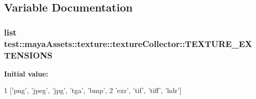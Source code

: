 \subsection{\-Variable \-Documentation}
\hypertarget{namespacetest_1_1mayaAssets_1_1texture_1_1textureCollector_a0fd5dad17efa7fba535d8811b6c4c6b9}{
\subsubsection[{\-T\-E\-X\-T\-U\-R\-E\-\_\-\-E\-X\-T\-E\-N\-S\-I\-O\-N\-S}]{\setlength{\rightskip}{0pt plus 5cm}list {\bf test\-::maya\-Assets\-::texture\-::texture\-Collector\-::\-T\-E\-X\-T\-U\-R\-E\-\_\-\-E\-X\-T\-E\-N\-S\-I\-O\-N\-S}}}\label{dc/d6f/namespacetest_1_1mayaAssets_1_1texture_1_1textureCollector_a0fd5dad17efa7fba535d8811b6c4c6b9}
{\bfseries \-Initial value\-:}
\begin{DoxyCode}
1 ['png', 'jpeg', 'jpg', 'tga', 'bmp',
2                       'exr', 'tif', 'tiff', 'hdr']
\end{DoxyCode}
